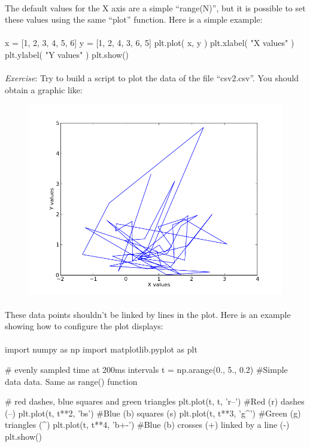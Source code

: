 \documentclass[article,10pt]{scrartcl}
\begin{document}
\paragraph{}
The default values for the X axis are a simple ``range(N)'', but it is possible to set these values using the same ``plot'' function. Here is a simple example:
\paragraph{}
\begin{python}
x = [1, 2, 3, 4, 5, 6]
y = [1, 2, 4, 3, 6, 5]  
plt.plot( x, y )
plt.xlabel( "X values" )
plt.ylabel( "Y values" )
plt.show()
\end{python}
\paragraph{}
\emph{Exercise}: Try to build a script to plot the data of the file ``csv2.csv''.
You should obtain a graphic like:
\begin{figure}[h!]
\begin{center}
\includegraphics[scale=0.5]{figure_1.png}\\
\end{center}
\end{figure}
\paragraph{}
These data points shouldn't be linked by lines in the plot. Here is an example showing how to configure the plot displays:
\paragraph{}
\begin{python}
import numpy as np
import matplotlib.pyplot as plt

# evenly sampled time at 200ms intervals
t = np.arange(0., 5., 0.2) #Simple data data. Same as range() function

# red dashes, blue squares and green triangles
plt.plot(t, t, 'r--')    #Red (r) dashes (--)
plt.plot(t, t**2, 'bs')  #Blue (b) squares (s)
plt.plot(t, t**3, 'g^')  #Green (g) triangles (^)
plt.plot(t, t**4, 'b+-') #Blue (b) crosses (+) linked by a line (-)
plt.show()
\end{python}
\end{document}
